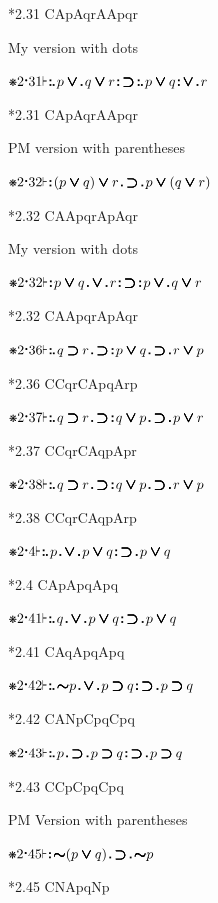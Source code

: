 \documentclass[12pt]{article}
\newcommand{\pmthm}{\mathpunct{\text{\scalebox{.5}[1]{$\boldsymbol\vdash$}}}} %
\newcommand{\pmast}{\text{\resizebox{!}{.75\height}{\ding{107}}}} %
\newcommand{\pmcdot}{\text{\raisebox{.05cm}{$\boldsymbol\cdot$}}} %
\newcommand{\pmd}{\hbox{\rule{.3ex}{.3ex}}} %
\newcommand{\pmdd}{\overset{\pmd}{\pmd}} %
\newcommand{\pmdot}{\mathinner{\pmd}}
\newcommand{\pmdott}{\mathinner{\pmdd}}
\newcommand{\pmdottt}{\mathinner{\pmdd\hspace{1pt}\pmd}}
\newcommand{\pmnot}{\mathord{\ooalign{$\boldsymbol{\sim}\mkern.5mu$\hidewidth\cr$\boldsymbol{\sim}$\cr\hidewidth$\mkern.5mu\boldsymbol{\sim}$}}}
\newcommand{\pmor}{\mathbin{\ooalign{$\boldsymbol{\vee}\mkern.5mu$\hidewidth\cr$\boldsymbol{\vee}$\cr\hidewidth$\mkern.5mu\boldsymbol{\vee}$}}}
\newcommand{\pmimp}{\mathbin{\ooalign{$\boldsymbol{\supset}\mkern.5mu$\hidewidth\cr$\boldsymbol{\supset}$\cr\hidewidth$\mkern.5mu\boldsymbol{\supset}$}}} %
\begin{document}
*2.31 CApAqrAApqr

My version with dots 

$\pmast 2 \pmcdot 31 \pmthm \pmdottt p \pmor \pmdot q \pmor r \pmdott \pmimp \pmdottt p \pmor q \pmdott \pmor \pmdot r   $

*2.31 CApAqrAApqr

PM version with parentheses

$\pmast 2 \pmcdot 32 \pmthm \pmdott ( p \pmor q ) \pmor r \pmdot \pmimp \pmdot p \pmor ( q \pmor r ) $

*2.32 CAApqrApAqr

My version with dots 

$\pmast 2 \pmcdot 32 \pmthm \pmdott p \pmor  q \pmdot \pmor \pmdot r \pmdott \pmimp \pmdott p \pmor \pmdot q \pmor r   $

*2.32 CAApqrApAqr

$\pmast 2 \pmcdot 36 \pmthm \pmdottt q \pmimp r \pmdot \pmimp \pmdott p \pmor q \pmdot \pmimp \pmdot r \pmor p     $

*2.36 CCqrCApqArp

$\pmast 2 \pmcdot 37 \pmthm \pmdottt q \pmimp r \pmdot \pmimp \pmdott q \pmor p \pmdot \pmimp \pmdot p \pmor r     $

*2.37 CCqrCAqpApr

$\pmast 2 \pmcdot 38 \pmthm \pmdottt q \pmimp r \pmdot \pmimp \pmdott q \pmor p \pmdot \pmimp \pmdot r \pmor p     $

*2.38 CCqrCAqpArp

$\pmast 2 \pmcdot 4 \pmthm \pmdottt p \pmdot \pmor \pmdot p \pmor q \pmdott \pmimp \pmdot p \pmor q   $

*2.4 CApApqApq

$\pmast 2 \pmcdot 41 \pmthm \pmdottt q \pmdot \pmor \pmdot p \pmor q \pmdott \pmimp \pmdot p \pmor q      $

*2.41 CAqApqApq

$\pmast 2 \pmcdot 42 \pmthm \pmdottt \pmnot p \pmdot \pmor \pmdot p \pmimp q \pmdott \pmimp \pmdot p \pmimp q            $

*2.42 CANpCpqCpq

$\pmast 2 \pmcdot 43 \pmthm \pmdottt p \pmdot \pmimp \pmdot p \pmimp q \pmdott \pmimp \pmdot p \pmimp q     $

*2.43 CCpCpqCpq

PM Version with parentheses

$\pmast 2 \pmcdot 45 \pmthm \pmdott \pmnot ( p \pmor q ) \pmdot \pmimp \pmdot \pmnot p      $

*2.45 CNApqNp
\end{document}
